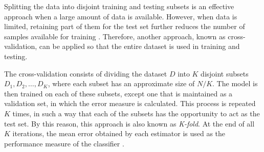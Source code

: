 Splitting the data into disjoint training and testing subsets is an effective approach when a large amount of data is available. However, when data is limited, retaining part of them for the test set further reduces the number of samples available for training \citep{mitchell:97}. Therefore, another approach, known as cross-validation, can be applied so that the entire dataset is used in training and testing.

The cross-validation consists of dividing the dataset $D$ into $K$ disjoint subsets $D_1, D_2, \ldots, D_K$, where each subset has an approximate size of $N / K$. The model is then trained on each of these subsets, except one that is maintained as a validation set, in which the error measure is calculated. This process is repeated $K$ times, in such a way that each of the subsets has the opportunity to act as the test set. By this reason, this approach is also known as \emph{K-fold}. At the end of all $K$ iterations, the mean error obtained by each estimator is used as the performance measure of the classifier \citep{mostafa:12}.